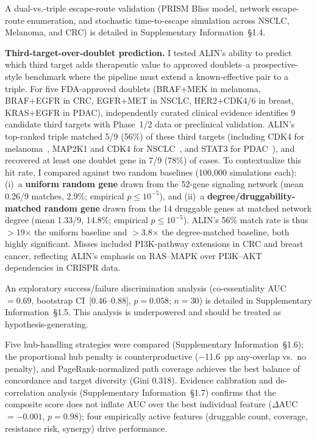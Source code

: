 \documentclass[11pt]{article}
\begin{document}
A dual-vs.-triple escape-route validation (PRISM Bliss model, network escape-route enumeration, and stochastic time-to-escape simulation across NSCLC, Melanoma, and CRC) is detailed in Supplementary Information~\S1.4.

\textbf{Third-target-over-doublet prediction.}
I tested ALIN's ability to predict which third target adds therapeutic value to approved doublets--a prospective-style benchmark where the pipeline must extend a known-effective pair to a triple.
For five FDA-approved doublets (BRAF+MEK in melanoma, BRAF+EGFR in CRC, EGFR+MET in NSCLC, HER2+CDK4/6 in breast, KRAS+EGFR in PDAC), independently curated clinical evidence identifies 9 candidate third targets with Phase~1/2 data or preclinical validation.
ALIN's top-ranked triple matched 5/9 (56\%) of these third targets (including CDK4 for melanoma~\cite{Sullivan2020CDK46MEL}, MAP2K1 and CDK4 for NSCLC~\cite{Oxnard2018}, and STAT3 for PDAC~\cite{Liaki2025}), and recovered at least one doublet gene in 7/9 (78\%) of cases.
To contextualize this hit rate, I compared against two random baselines (100{,}000 simulations each): (i)~a \textbf{uniform random gene} drawn from the 52-gene signaling network (mean 0.26/9 matches, 2.9\%; empirical $p \leq 10^{-5}$), and (ii)~a \textbf{degree/druggability-matched random gene} drawn from the 14 druggable genes at matched network degree (mean 1.33/9, 14.8\%; empirical $p \leq 10^{-5}$). ALIN's 56\% match rate is thus $>$19$\times$ the uniform baseline and $>$3.8$\times$ the degree-matched baseline, both highly significant.
Misses included PI3K-pathway extensions in CRC and breast cancer, reflecting ALIN's emphasis on RAS--MAPK over PI3K--AKT dependencies in CRISPR data.

An exploratory success/failure discrimination analysis (co-essentiality AUC~$= 0.69$, bootstrap CI~$[0.46$--$0.88]$, $p = 0.058$; $n = 30$) is detailed in Supplementary Information~\S1.5. This analysis is underpowered and should be treated as hypothesis-generating.

Five hub-handling strategies were compared (Supplementary Information~\S1.6); the proportional hub penalty is counterproductive ($-$11.6~pp any-overlap vs.\ no penalty), and PageRank-normalized path coverage achieves the best balance of concordance and target diversity (Gini 0.318). Evidence calibration and de-correlation analysis (Supplementary Information~\S1.7) confirms that the composite score does not inflate AUC over the best individual feature ($\Delta$AUC~$= -0.001$, $p = 0.98$); four empirically active features (druggable count, coverage, resistance risk, synergy) drive performance.
\end{document}
